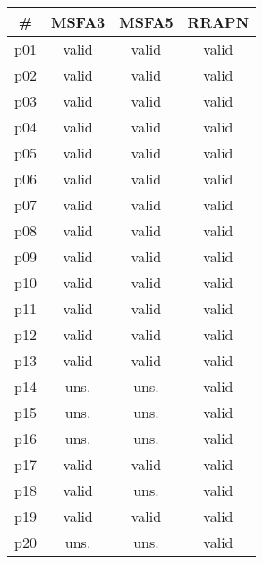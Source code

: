 \begin{tabular}{cccc}
\toprule
\textbf{\#} & \textbf{MSFA3} & \textbf{MSFA5} & \textbf{RRAPN}\\
\midrule
p01 & valid & valid & valid\\
p02 & valid & valid & valid\\
p03 & valid & valid & valid\\
p04 & valid & valid & valid\\
p05 & valid & valid & valid\\
p06 & valid & valid & valid\\
p07 & valid & valid & valid\\
p08 & valid & valid & valid\\
p09 & valid & valid & valid\\
p10 & valid & valid & valid\\
p11 & valid & valid & valid\\
p12 & valid & valid & valid\\
p13 & valid & valid & valid\\
p14 & uns. & uns. & valid\\
p15 & uns. & uns. & valid\\
p16 & uns. & uns. & valid\\
p17 & valid & valid & valid\\
p18 & valid & uns. & valid\\
p19 & valid & valid & valid\\
p20 & uns. & uns. & valid\\
\bottomrule
\end{tabular}

